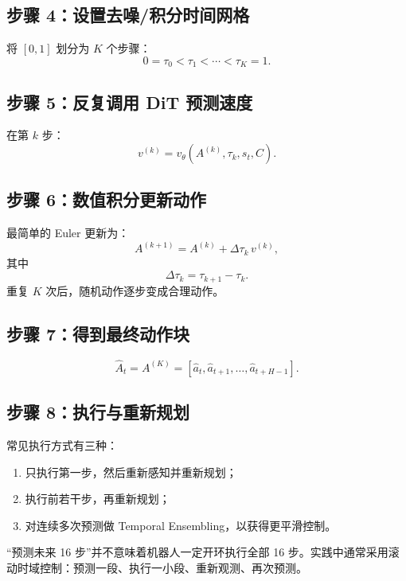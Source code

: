 \documentclass[UTF8,11pt,a4paper]{ctexart}
\begin{document}
\subsection{步骤 4：设置去噪/积分时间网格}
将 $[0,1]$ 划分为 $K$ 个步骤：
\[
0=\tau_0<\tau_1<\cdots<\tau_K=1.
\]

\subsection{步骤 5：反复调用 DiT 预测速度}
在第 $k$ 步：
\[
v^{(k)}=v_\theta(A^{(k)},\tau_k,s_t,C).
\]

\subsection{步骤 6：数值积分更新动作}
最简单的 Euler 更新为：
\[
A^{(k+1)}=A^{(k)}+\Delta\tau_k\,v^{(k)},
\]
其中
\[
\Delta\tau_k=\tau_{k+1}-\tau_k.
\]
重复 $K$ 次后，随机动作逐步变成合理动作。

\subsection{步骤 7：得到最终动作块}
\[
\hat A_t=A^{(K)}=[\hat a_t,\hat a_{t+1},\ldots,\hat a_{t+H-1}].
\]

\subsection{步骤 8：执行与重新规划}
常见执行方式有三种：
\begin{enumerate}
  \item 只执行第一步，然后重新感知并重新规划；
  \item 执行前若干步，再重新规划；
  \item 对连续多次预测做 Temporal Ensembling，以获得更平滑控制。
\end{enumerate}

\begin{warningbox}
“预测未来 16 步”并不意味着机器人一定开环执行全部 16 步。实践中通常采用滚动时域控制：预测一段、执行一小段、重新观测、再次预测。
\end{warningbox}
\end{document}

